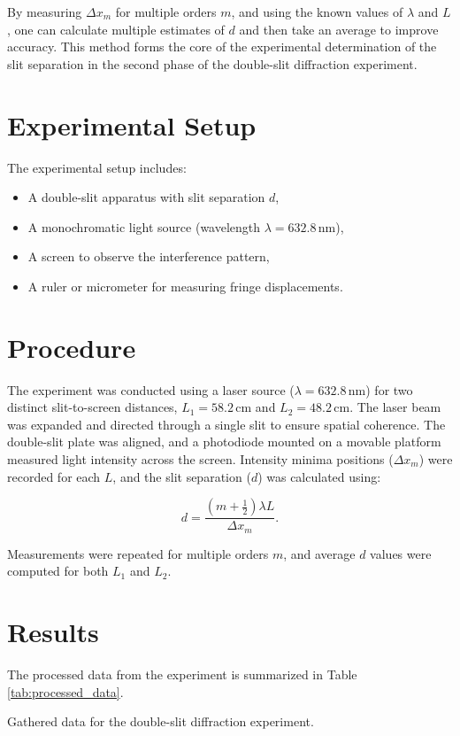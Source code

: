\documentclass[journal]{IEEEtran}
\begin{document}
By measuring \( \Delta x_m \) for multiple orders \( m \), and using the known values of \( \lambda \) and \( L \), one can calculate multiple estimates of \( d \) and then take an average to improve accuracy. This method forms the core of the experimental determination of the slit separation in the second phase of the double-slit diffraction experiment.

\section{Experimental Setup}
The experimental setup includes:
\begin{itemize}
    \item A double-slit apparatus with slit separation $d$,
    \item A monochromatic light source (wavelength $\lambda = 632.8 \, \text{nm}$),
    \item A screen to observe the interference pattern,
    \item A ruler or micrometer for measuring fringe displacements.
\end{itemize}
\section*{Procedure}

The experiment was conducted using a laser source (\( \lambda = 632.8\,\text{nm} \)) for two distinct slit-to-screen distances, \( L_1 = 58.2 \, \text{cm} \) and \( L_2 = 48.2 \, \text{cm} \). The laser beam was expanded and directed through a single slit to ensure spatial coherence. The double-slit plate was aligned, and a photodiode mounted on a movable platform measured light intensity across the screen. Intensity minima positions (\( \Delta x_m \)) were recorded for each \( L \), and the slit separation (\( d \)) was calculated using:

\[
d = \frac{(m + \tfrac{1}{2}) \lambda L}{\Delta x_m}.
\]

Measurements were repeated for multiple orders \( m \), and average \( d \) values were computed for both \( L_1 \) and \( L_2 \).


\section{Results}
The processed data from the experiment is summarized in Table \ref{tab:processed_data}.

\begin{table}[H]
    \centering
    \caption{Gathered data for the double-slit diffraction experiment.}
    \label{tab:processed_data}
\end{table}
\end{document}
